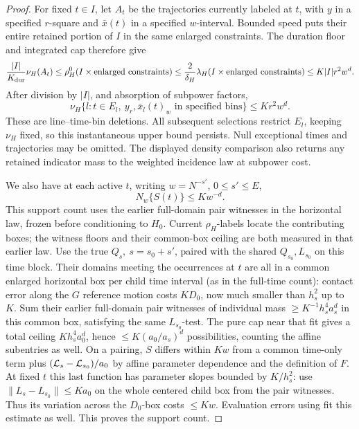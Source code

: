 \begin{proof}
For fixed \(t\in I\), let \(A_t\) be the trajectories currently
labeled at \(t\), with \(y\) in a specified \(r\)-square and
\(\bar x(t)\) in a specified \(w\)-interval. Bounded speed
puts their entire retained portion of \(I\) in the same enlarged
constraints. The duration floor and integrated cap therefore give
\[
 \frac{|I|}{K_{\rm dur}}\nu_H(A_t)
 \le \rho_H^0(I\times\text{enlarged constraints})
 \le \frac{2}{\delta_H}
       \lambda_H(I\times\text{enlarged constraints})
 \le K|I|r^2w^d.
\]
After division by \(|I|\), and absorption of subpower factors,
\[
 \nu_H\{l:t\in E_l,\ y_r,\bar x_l(t)_w
                    \text{ in specified bins}\}\le Kr^2w^d.
\]
These are line--time-bin deletions. All subsequent selections
restrict \(E_l\), keeping \(\nu_H\) fixed, so this instantaneous
upper bound persists. Null exceptional times and trajectories may
be omitted. The displayed density comparison also returns any
retained indicator mass to the weighted incidence law at subpower
cost.

We also have at each active \(t\), writing \(w=N^{-s'}\), \(0\le s'\le E\),
\[
 N_w\{S(t)\}\le K w^{-d}.
\]
This support count uses the earlier full-domain pair witnesses in
the horizontal law, frozen before conditioning to \(H_0\). Current
\(\rho_H\)-labels locate the contributing boxes; the witness
floors and their common-box ceiling are both measured in that
earlier law.
Use the true \(Q_s,\ s=s_0+s'\), paired with the shared \(Q_{s_0},L_{s_0}\) on this time block. Their domains meeting the occurrences at \(t\) are all in a common enlarged horizontal box per child time interval (as in the full-time count): contact error along the \(G\) reference motion costs \(K D_0\), now much smaller than \(h_s^2\) up to \(K\). Sum their earlier full-domain pair witnesses of individual mass \(\ge K^{-1}h_s^4 a_s^d\) in this common box, satisfying the same \(L_{s_0}\)-test. The pure cap near that fit gives a total ceiling \(K h_s^4 a_0^d\), hence \(\le K(a_0/a_s)^d\) possibilities, counting the affine subentries as well. On a pairing, \(S\) differs within \(K w\) from a common time-only term plus \(({\cal L}_s-{\cal L}_{s_0})/a_0\) by affine parameter dependence and the definition of \(F\). At fixed \(t\) this last function has parameter slopes bounded by \(K/h_s^2\): use \(\|L_s-L_{s_0}\|\le K a_0\) on the whole centered child box from the pair witnesses. Thus its variation across the \(D_0\)-box costs \(\le K w\). Evaluation errors using  fit this estimate as well. This proves the support count.


\end{proof}
